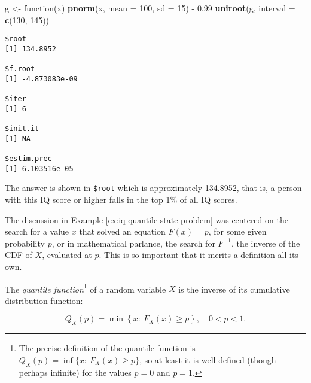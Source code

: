 \documentclass[]{book}
\newenvironment{Shaded}{\begin{snugshade}}{\end{snugshade}}
\newcommand{\KeywordTok}[1]{\textcolor[rgb]{0.13,0.29,0.53}{\textbf{{#1}}}}
\newcommand{\DataTypeTok}[1]{\textcolor[rgb]{0.13,0.29,0.53}{{#1}}}
\newcommand{\DecValTok}[1]{\textcolor[rgb]{0.00,0.00,0.81}{{#1}}}
\newcommand{\FloatTok}[1]{\textcolor[rgb]{0.00,0.00,0.81}{{#1}}}
\newcommand{\StringTok}[1]{\textcolor[rgb]{0.31,0.60,0.02}{{#1}}}
\newcommand{\NormalTok}[1]{{#1}}
\let\rmarkdownfootnote\footnote%
\def\footnote{\protect\rmarkdownfootnote}
\numberwithin{equation}{chapter}
\numberwithin{figure}{chapter}
\theoremstyle{plain}
\theoremstyle{definition}
\theoremstyle{remark}
\theoremstyle{definition}
\theoremstyle{definition}
\theoremstyle{remark}
\let\BeginKnitrBlock\begin \let\EndKnitrBlock\end
\begin{document}
\begin{Shaded}
\begin{Highlighting}[]
\NormalTok{g <-}\StringTok{ }\NormalTok{function(x) }\KeywordTok{pnorm}\NormalTok{(x, }\DataTypeTok{mean =} \DecValTok{100}\NormalTok{, }\DataTypeTok{sd =} \DecValTok{15}\NormalTok{) -}\StringTok{ }\FloatTok{0.99}
\KeywordTok{uniroot}\NormalTok{(g, }\DataTypeTok{interval =} \KeywordTok{c}\NormalTok{(}\DecValTok{130}\NormalTok{, }\DecValTok{145}\NormalTok{))}
\end{Highlighting}
\end{Shaded}

\begin{verbatim}
$root
[1] 134.8952

$f.root
[1] -4.873083e-09

$iter
[1] 6

$init.it
[1] NA

$estim.prec
[1] 6.103516e-05
\end{verbatim}

The answer is shown in \texttt{\$root} which is approximately 134.8952,
that is, a person with this IQ score or higher falls in the top 1\% of
all IQ scores.

The discussion in Example \ref{ex:iq-quantile-state-problem} was
centered on the search for a value \(x\) that solved an equation
\(F(x)=p\), for some given probability \(p\), or in mathematical
parlance, the search for \(F^{-1}\), the inverse of the CDF of \(X\),
evaluated at \(p\). This is so important that it merits a definition all
its own.

\bigskip

\BeginKnitrBlock{definition}
\protect\hypertarget{def:unnamed-chunk-272}{}{\label{def:unnamed-chunk-272}}The
\emph{quantile function}\footnote{The precise definition of the quantile
  function is \(Q_{X}(p)=\inf \{ x:\ F_{X}(x)\geq p \}\), so at least it
  is well defined (though perhaps infinite) for the values \(p=0\) and
  \(p=1\).} of a random variable \(X\) is the inverse of its cumulative
distribution function:

\begin{equation}
Q_{X}(p)=\min\left\{ x:\ F_{X}(x)\geq p\right\} ,\quad 0 < p <1.
\end{equation}
\EndKnitrBlock{definition}

\bigskip
\end{document}
